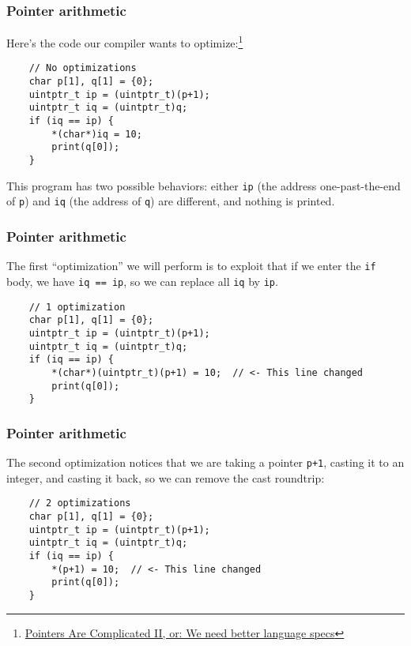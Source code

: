 \documentclass[aspectratio=1610,t]{beamer}
\begin{document}

\begin{frame}[fragile]
\frametitle{Pointer arithmetic}
Here's the code our compiler wants to optimize:\footnote{\href{https://www.ralfj.de/blog/2020/12/14/provenance.html}{Pointers Are Complicated II, or: We need better language specs}}

\begin{verbatim}
    // No optimizations
    char p[1], q[1] = {0};
    uintptr_t ip = (uintptr_t)(p+1);
    uintptr_t iq = (uintptr_t)q;
    if (iq == ip) {
        *(char*)iq = 10;
        print(q[0]);
    }
\end{verbatim}

This program has two possible behaviors: either \texttt{ip} (the address one-past-the-end of \texttt{p}) and \texttt{iq} (the address of \texttt{q}) are different, and nothing is printed.
\end{frame}


\begin{frame}[fragile]
\frametitle{Pointer arithmetic}
The first ``optimization'' we will perform is to exploit that if we enter the \texttt{if} body, we have \texttt{iq == ip}, so we can replace all \texttt{iq} by \texttt{ip}.

\begin{verbatim}
    // 1 optimization
    char p[1], q[1] = {0};
    uintptr_t ip = (uintptr_t)(p+1);
    uintptr_t iq = (uintptr_t)q;
    if (iq == ip) {
        *(char*)(uintptr_t)(p+1) = 10;  // <- This line changed
        print(q[0]);
    }
\end{verbatim}
\end{frame}


\begin{frame}[fragile]
\frametitle{Pointer arithmetic}
The second optimization notices that we are taking a pointer \texttt{p+1}, casting it to an integer, and casting it back, so we can remove the cast roundtrip:

\begin{verbatim}
    // 2 optimizations
    char p[1], q[1] = {0};
    uintptr_t ip = (uintptr_t)(p+1);
    uintptr_t iq = (uintptr_t)q;
    if (iq == ip) {
        *(p+1) = 10;  // <- This line changed
        print(q[0]);
    }
\end{verbatim}
\end{frame}
\end{document}
